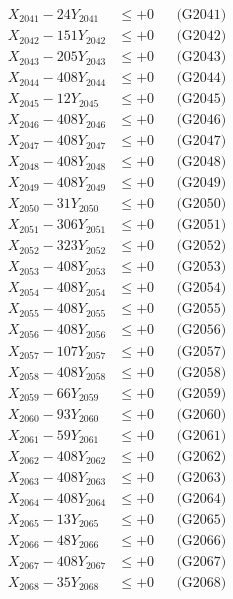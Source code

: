 \documentclass[a4paper,10pt]{article}
\begin{document}
{\begin{align}
\allowbreak
X_{2041} - 24Y_{2041} &\leq +0 && \text{(G2041)} \\
X_{2042} - 151Y_{2042} &\leq +0 && \text{(G2042)} \\
X_{2043} - 205Y_{2043} &\leq +0 && \text{(G2043)} \\
X_{2044} - 408Y_{2044} &\leq +0 && \text{(G2044)} \\
X_{2045} - 12Y_{2045} &\leq +0 && \text{(G2045)} \\
X_{2046} - 408Y_{2046} &\leq +0 && \text{(G2046)} \\
X_{2047} - 408Y_{2047} &\leq +0 && \text{(G2047)} \\
X_{2048} - 408Y_{2048} &\leq +0 && \text{(G2048)} \\
X_{2049} - 408Y_{2049} &\leq +0 && \text{(G2049)} \\
X_{2050} - 31Y_{2050} &\leq +0 && \text{(G2050)} \\
\allowbreak
X_{2051} - 306Y_{2051} &\leq +0 && \text{(G2051)} \\
X_{2052} - 323Y_{2052} &\leq +0 && \text{(G2052)} \\
X_{2053} - 408Y_{2053} &\leq +0 && \text{(G2053)} \\
X_{2054} - 408Y_{2054} &\leq +0 && \text{(G2054)} \\
X_{2055} - 408Y_{2055} &\leq +0 && \text{(G2055)} \\
X_{2056} - 408Y_{2056} &\leq +0 && \text{(G2056)} \\
X_{2057} - 107Y_{2057} &\leq +0 && \text{(G2057)} \\
X_{2058} - 408Y_{2058} &\leq +0 && \text{(G2058)} \\
X_{2059} - 66Y_{2059} &\leq +0 && \text{(G2059)} \\
X_{2060} - 93Y_{2060} &\leq +0 && \text{(G2060)} \\
\allowbreak
X_{2061} - 59Y_{2061} &\leq +0 && \text{(G2061)} \\
X_{2062} - 408Y_{2062} &\leq +0 && \text{(G2062)} \\
X_{2063} - 408Y_{2063} &\leq +0 && \text{(G2063)} \\
X_{2064} - 408Y_{2064} &\leq +0 && \text{(G2064)} \\
X_{2065} - 13Y_{2065} &\leq +0 && \text{(G2065)} \\
X_{2066} - 48Y_{2066} &\leq +0 && \text{(G2066)} \\
X_{2067} - 408Y_{2067} &\leq +0 && \text{(G2067)} \\
X_{2068} - 35Y_{2068} &\leq +0 && \text{(G2068)} \\

\end{align}}
\end{document}
